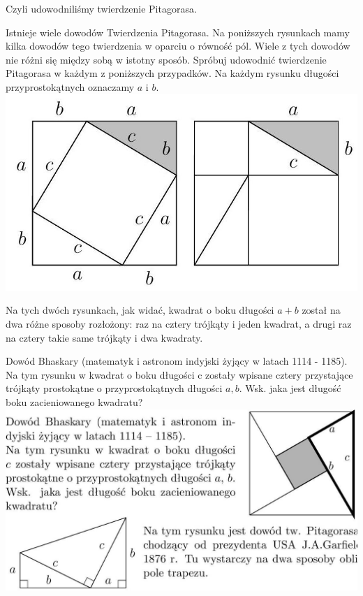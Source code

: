 \documentclass[10pt]{article}
\begin{document}
Czyli udowodniliśmy twierdzenie Pitagorasa.

Istnieje wiele dowodów Twierdzenia Pitagorasa. Na poniższych rysunkach mamy kilka dowodów tego twierdzenia w oparciu o równość pól. Wiele z tych dowodów nie różni się między sobą w istotny sposób. Spróbuj udowodnić twierdzenie Pitagorasa w każdym z poniższych przypadków. Na każdym rysunku długości przyprostokątnych oznaczamy \(a\) i \(b\).\\
\includegraphics[max width=\textwidth, center]{2024_11_21_71f62bd117d375398909g-123}

Na tych dwóch rysunkach, jak widać, kwadrat o boku długości \(a+b\) został na dwa różne sposoby rozłożony: raz na cztery trójkąty i jeden kwadrat, a drugi raz na cztery takie same trójkąty i dwa kwadraty.

Dowód Bhaskary (matematyk i astronom indyjski żyjący w latach 1114 - 1185).\\
Na tym rysunku w kwadrat o boku długości c zostały wpisane cztery przystające trójkąty prostokątne o przyprostokątnych długości \(a, b\). Wsk. jaka jest długość boku zacieniowanego kwadratu?\\
\includegraphics[max width=\textwidth, center]{2024_11_21_71f62bd117d375398909g-123(1)}
\end{document}
